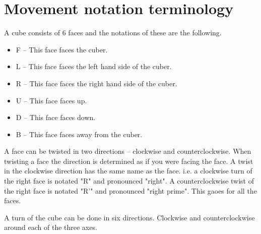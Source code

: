 \section{Movement notation terminology}
A cube consists of 6 faces and the notations of these are the following.
\begin{itemize}
\label{move notation}
\item {} F -- This face faces the cuber.
\item {} L -- This face faces the left hand side of the cuber.
\item {} R -- This face faces the right hand side of the cuber.
\item {} U -- This face faces up.
\item {} D -- This face faces down.
\item {} B -- This face faces away from the cuber.
\end{itemize} 

A face can be twisted in two directions -- clockwise and counterclockwise. When twisting a face the direction is determined as if you were facing the face.
A twist in the clockwise direction has the same name as the face. i.e. a clockwise turn of the right face is notated "R" and pronounced "right". A counterclockwise twist of the right face is notated "R'" and pronounced "right prime". This gaoes for all the faces.

A turn of the cube can be done in six directions. Clockwise and counterclockwise around each of the three axes.




